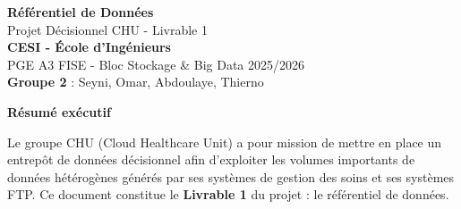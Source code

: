 \documentclass[12pt, a4paper]{report}
\begin{document}
\begin{titlepage}
    \pagecolor{chuBlue}
    \color{white}
    
    \vspace*{4cm}
    \begin{center}
        {\fontsize{24}{28}\selectfont\textbf{Référentiel de Données}}\\[0.8cm]
        {\fontsize{18}{22}\selectfont Projet Décisionnel CHU - Livrable 1}\\[2cm]
        
        \vspace{2cm}
        {\fontsize{14}{16}\selectfont\textbf{CESI - École d'Ingénieurs}}\\[0.3cm]
        {\large PGE A3 FISE - Bloc Stockage \& Big Data 2025/2026}\\[1.5cm]
        
        {\normalsize \textbf{Groupe 2} : Seyni, Omar, Abdoulaye, Thierno}
    \end{center}
\end{titlepage}
\nopagecolor %

\clearpage
\thispagestyle{empty}
\begin{center}
    {\large\bfseries\color{chuBlue} Résumé exécutif}
\end{center}
\vspace{0.5cm}

\begin{infobox}[Contexte]
Le groupe CHU (Cloud Healthcare Unit) a pour mission de mettre en place un entrepôt de données décisionnel afin d'exploiter les volumes importants de données hétérogènes générés par ses systèmes de gestion des soins et ses systèmes FTP. Ce document constitue le \textbf{Livrable 1} du projet : le référentiel de données.
\end{infobox}
\vspace{0.8cm}
\end{document}
